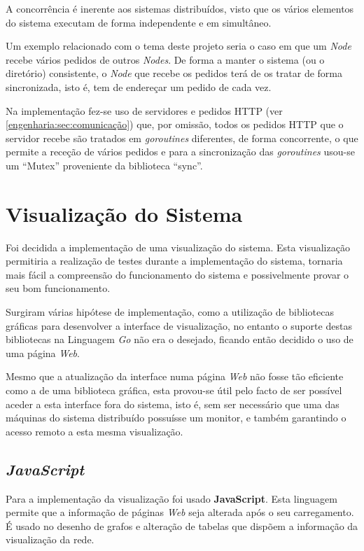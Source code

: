 A concorrência é inerente aos sistemas distribuídos, visto que os vários elementos do sistema executam de forma independente e em simultâneo.

Um exemplo relacionado com o tema deste projeto seria o caso em que um \emph{Node} recebe vários pedidos de outros \emph{Nodes}.
De forma a manter o sistema (ou o diretório) consistente,
o \emph{Node} que recebe os pedidos terá de os tratar de forma sincronizada, isto é, tem de endereçar um pedido de cada vez.

Na implementação fez-se uso de servidores e pedidos \acs{HTTP} (ver \ref{engenharia:sec:comunicação}) que, por omissão,
todos os pedidos \acs{HTTP} que o servidor recebe são tratados em \emph{goroutines} diferentes,
de forma concorrente, o que permite a receção de vários pedidos e 
para a sincronização das \emph{goroutines} usou-se um ``Mutex'' proveniente da biblioteca ``sync''.





\section{Visualização do Sistema}
Foi decidida a implementação de uma visualização do sistema. 
Esta visualização permitiria a realização de testes durante a implementação do sistema,
tornaria mais fácil a compreensão do funcionamento do sistema e possivelmente provar o seu bom funcionamento.

Surgiram várias hipótese de implementação, como a utilização de bibliotecas gráficas para desenvolver a interface de visualização,
no entanto o suporte destas bibliotecas na Linguagem \emph{Go} não era o desejado, ficando então decidido o uso de uma página \emph{Web}.

Mesmo que a atualização da interface numa página \emph{Web} não fosse tão eficiente como a de uma biblioteca gráfica, esta provou-se útil 
pelo facto de ser possível aceder a esta interface fora do sistema, isto é, sem ser necessário que uma das máquinas do sistema distribuído possuísse 
um monitor, e também garantindo o acesso remoto a esta mesma visualização.

\subsection*{\emph{JavaScript}}
Para a implementação da visualização foi usado \textbf{JavaScript}.
Esta linguagem permite que a informação de páginas \emph{Web} seja alterada após o seu carregamento.
É usado no desenho de grafos e alteração de tabelas que dispõem a informação da visualização da rede.

